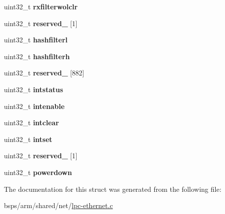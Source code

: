 \begin{DoxyCompactItemize}
uint32\+\_\+t {\bfseries rxfilterwolclr}
\item 
\mbox{\label{structlpc__eth__controller_aa115340d60530fd22719356ad54317d5}} 
uint32\+\_\+t {\bfseries reserved\+\_} \mbox{[}1\mbox{]}
\item 
\mbox{\label{structlpc__eth__controller_a31dd66689f511926bec5c2f2220842f4}} 
uint32\+\_\+t {\bfseries hashfilterl}
\item 
\mbox{\label{structlpc__eth__controller_a0bb696a75d03efa46dacba5983859f06}} 
uint32\+\_\+t {\bfseries hashfilterh}
\item 
\mbox{\label{structlpc__eth__controller_ac2da2b77cae803e1d5a2ca3303d6f1a2}} 
uint32\+\_\+t {\bfseries reserved\+\_} \mbox{[}882\mbox{]}
\item 
\mbox{\label{structlpc__eth__controller_ad86af83d0edbb81d6c866b6654e2c37f}} 
uint32\+\_\+t {\bfseries intstatus}
\item 
\mbox{\label{structlpc__eth__controller_a4c4f04e738a203d00ee7bed73a0c3559}} 
uint32\+\_\+t {\bfseries intenable}
\item 
\mbox{\label{structlpc__eth__controller_ab58a9c4f6d924e5539198c8fc73f7068}} 
uint32\+\_\+t {\bfseries intclear}
\item 
\mbox{\label{structlpc__eth__controller_ab52c9461893cdb5c99cf310abac2170f}} 
uint32\+\_\+t {\bfseries intset}
\item 
\mbox{\label{structlpc__eth__controller_ad20e9dd82106100e61bb4ebde182f908}} 
uint32\+\_\+t {\bfseries reserved\+\_} \mbox{[}1\mbox{]}
\item 
\mbox{\label{structlpc__eth__controller_a3636f6bae9f8cee9fd9faa31c40c4a1a}} 
uint32\+\_\+t {\bfseries powerdown}
\end{DoxyCompactItemize}


The documentation for this struct was generated from the following file\+:\begin{DoxyCompactItemize}
\item 
bsps/arm/shared/net/\mbox{\hyperlink{lpc-ethernet_8c}{lpc-\/ethernet.\+c}}\end{DoxyCompactItemize}
